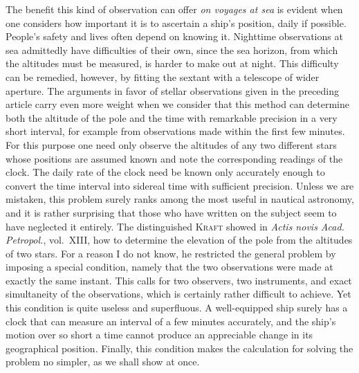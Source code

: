 The benefit this kind of observation can offer \textit{on voyages at sea} is evident when one considers how important it is to ascertain a ship’s position, daily if possible. People’s safety and lives often depend on knowing it. Nighttime observations at sea admittedly have difficulties of their own, since the sea horizon, from which the altitudes must be measured, is harder to make out at night. This difficulty can be remedied, however, by fitting the sextant with a telescope of wider aperture.
The arguments in favor of stellar observations given in the preceding article carry even more weight when we consider that this method can determine both the altitude of the pole and the time with remarkable precision in a very short interval, for example from observations made within the first few minutes. For this purpose one need only observe the altitudes of any two different stars whose positions are assumed known and note the corresponding readings of the clock. The daily rate of the clock need be known only accurately enough to convert the time interval into sidereal time with sufficient precision. Unless we are mistaken, this problem surely ranks among the most useful in nautical astronomy, and it is rather surprising that those who have written on the subject seem to have neglected it entirely. The distinguished \textsc{Kraft} showed in \textit{Actis novis Acad. Petropol.}, vol.~XIII, how to determine the elevation of the pole from the altitudes of two stars. For a reason I do not know, he restricted the general problem by imposing a special condition, namely that the two observations were
made at exactly the same instant. This calls for two observers, two instruments, and exact simultaneity of the observations, which is certainly rather difficult to achieve. Yet this condition is quite useless and superfluous. A well-equipped ship surely has a clock that can measure an interval of a few minutes accurately, and the ship’s motion over so short a time cannot produce an appreciable change in its geographical position. Finally, this condition makes the calculation for solving the problem no simpler, as we shall show at once.
